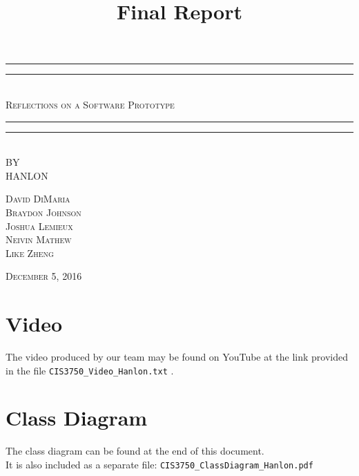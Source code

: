 \documentclass[12pt,letterpaper]{article}
\title{Final Report}
\begin{document}
\begin{titlepage}
    \centering
    \vspace*{\baselineskip}
    \rule{\textwidth}{1.6pt}\vspace*{-\baselineskip}\vspace*{2pt}
    \rule{\textwidth}{0.4pt}\\[1.5\baselineskip]
    {\LARGE \textsc{Reflections on a Software Prototype}}\\[\baselineskip]
	\rule{\textwidth}{0.4pt}\vspace*{-\baselineskip}\vspace{4pt}    
    \rule{\textwidth}{2pt}\\[2\baselineskip]
   
    \vspace*{5\baselineskip}
    \textsc{BY}\\[0.25\baselineskip]
    {\LARGE HANLON} \\
    
    \vspace*{\baselineskip}
    {\textsc{David DiMaria \\ Braydon Johnson \\ Joshua Lemieux \\ Neivin Mathew \\ Like Zheng} \par}
    \vfill
    {\scshape December 5, 2016} \\
  \end{titlepage}
  
  
\tableofcontents
\lhead{} %
\clearpage
{} %
    
\clearpage
\section{Video}
The video produced by our team may be found on YouTube at the link provided in the file \texttt{CIS3750\_Video\_Hanlon.txt} .

\clearpage
\section{Class Diagram}
The class diagram can be found at the end of this document.\\
It is also included as a separate file: \texttt{CIS3750\_ClassDiagram\_Hanlon.pdf}
\end{document}
